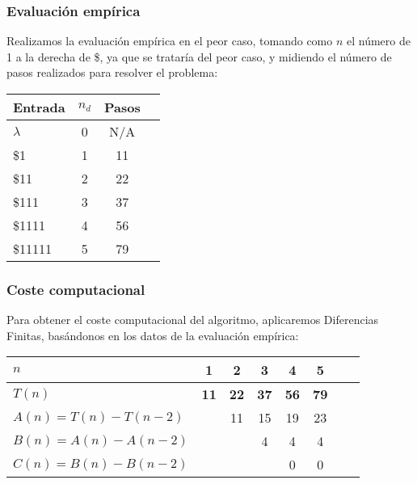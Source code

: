 \subsubsection*{Evaluación empírica}
Realizamos la evaluación empírica en el peor caso, tomando como $n$ el número de 1 a la derecha de \$, ya que se trataría del peor caso, y midiendo el número de pasos realizados para resolver el problema:

\begin{table}[h]
    \centering
    \begin{tabular}{lccc}
        Entrada & $n_d$ & Pasos \\
        \hline
        $\lambda$               & 0  & N/A \\
        \$1                     & 1  & 11  \\
        \$11                    & 2  & 22  \\
        \$111                   & 3  & 37  \\
        \$1111                  & 4  & 56  \\
        \$11111                 & 5  & 79  \\
        

    \end{tabular}
\end{table}


\subsubsection*{Coste computacional}
Para obtener el coste computacional del algoritmo, aplicaremos Diferencias Finitas, basándonos en los datos de la evaluación empírica:

\begin{table}[h]
    \centering
    \begin{tabular}{|l|c|c|c|c|c|c|c|}
        \hline
        $n$ & \textbf{1} & \textbf{2} & \textbf{3} & \textbf{4} & \textbf{5}\\ \hline
        $T(n)$ & \textbf{11} & \textbf{22} & \textbf{37} & \textbf{56} & \textbf{79}      \\ \hline
        \hline
        $A(n) = T(n) - T(n-2)$ &    & 11 & 15 & 19 & 23\\ \hline
        $B(n) = A(n) - A(n-2)$ &    &    &  4 &  4 &  4\\ \hline
        $C(n) = B(n) - B(n-2)$ &    &    &    &  0 &  0 \\ \hline
    \end{tabular}
\end{table}

